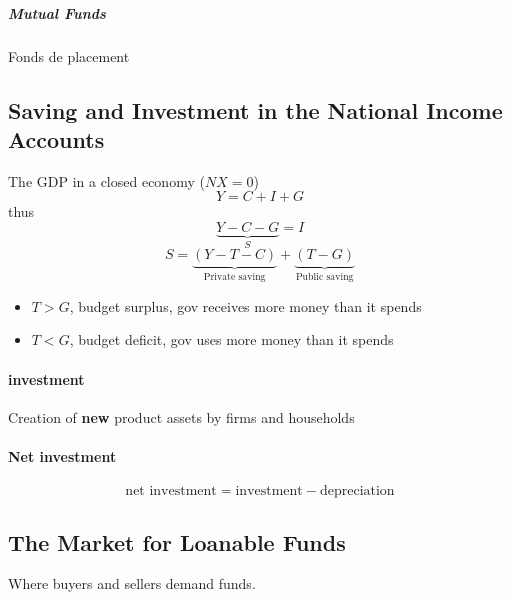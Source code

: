 \documentclass[a4paper,titlepage] {scrartcl}
\begin{document}
\subparagraph{Mutual Funds} %
\label{subp:mutual_funds}
Fonds de placement

\subsection{Saving and Investment in the National Income Accounts} %
\label{sub:saving_and_investment_in_the_national_income_accounts}
The GDP in a closed economy ($NX=0$)
\begin{equation}
	Y = C + I + G
\end{equation}
thus
\begin{equation}
	\underbrace{Y-C-G}_{S} = I
\end{equation}
\begin{equation}
	S=\underbrace{(Y-T-C)}_{\text{Private saving}}+\underbrace{(T-G)}_{\text{Public saving}}
\end{equation}

\begin{itemize}
	\item $T>G$, budget surplus, gov receives more money than it spends
	\item $T<G$, budget deficit, gov uses more money than it spends
\end{itemize}

\paragraph{investment} %
\label{par:investment}
Creation of \textbf{new} product assets by firms and households


\paragraph{Net investment} %
\label{par:net_investment}
\begin{equation}
	\text{net investment} = \text{investment}-\text{depreciation}
\end{equation}



\subsection{The Market for Loanable Funds} %
\label{sub:the_market_for_loanable_funds}
Where buyers and sellers demand funds.
\end{document}
